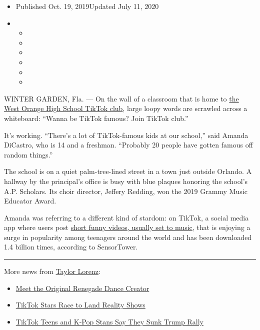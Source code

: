 \begin{itemize}
\item
  Published Oct. 19, 2019Updated July 11, 2020
\item
  \begin{itemize}
  \item
  \item
  \item
  \item
  \item
  \item
  \end{itemize}
\end{itemize}

WINTER GARDEN, Fla. --- On the wall of a classroom that is home to
\href{http://vm.tiktok.com/5qoKE6/}{the West Orange High School TikTok
club}, large loopy words are scrawled across a whiteboard: ``Wanna be
TikTok famous? Join TikTok club.''

It's working. ``There's a lot of TikTok-famous kids at our school,''
said Amanda DiCastro, who is 14 and a freshman. ``Probably 20 people
have gotten famous off random things.''

The school is on a quiet palm-tree-lined street in a town just outside
Orlando. A hallway by the principal's office is busy with blue plaques
honoring the school's A.P. Scholars. Its choir director, Jeffery
Redding, won the 2019 Grammy Music Educator Award.

Amanda was referring to a different kind of stardom: on TikTok, a social
media app where users post
\href{https://www.nytimes.com/2019/03/10/style/what-is-tik-tok.html}{short
funny videos, usually set to music}, that is enjoying a surge in
popularity among teenagers around the world and has been downloaded 1.4
billion times, according to SensorTower.

\begin{center}\rule{0.5\linewidth}{\linethickness}\end{center}

More news from \href{https://www.nytimes.com/by/taylor-lorenz}{Taylor
Lorenz}:

\begin{itemize}
\item
  \href{https://www.nytimes.com/2020/02/13/style/the-original-renegade.html}{Meet
  the Original Renegade Dance Creator}
\item
  \href{https://www.nytimes.com/2020/07/09/style/tiktok-stars-race-to-land-reality-shows.html}{TikTok
  Stars Race to Land Reality Shows}
\item
  \href{https://www.nytimes.com/2020/06/21/style/tiktok-trump-rally-tulsa.html}{TikTok
  Teens and K-Pop Stans Say They Sunk Trump Rally}
\end{itemize}

